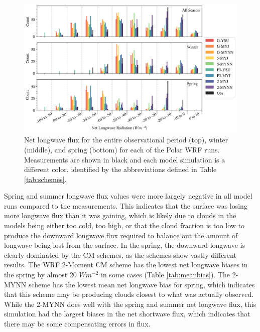 \begin{figure}[h!]
    \centering
    \includegraphics[width=1\linewidth]{figures/chapter3/WRF_NetLW_Histo.png}
    \caption[Polar WRF simulated net longwave flux histograms.]{Net longwave flux for the entire observational period (top), winter (middle), and spring (bottom) for each of the Polar WRF runs. Measurements are shown in black and each model simulation is a different color, identified by the abbreviations defined in Table \ref{tab:schemes}.}
    \label{fig:wrf_netlw}
\end{figure}

 Spring and summer longwave flux values were more largely negative in all model runs compared to the measurements. This indicates that the surface was losing more longwave flux than it was gaining, which is likely due to clouds in the models being either too cold, too high, or that the cloud fraction is too low to produce the downward longwave flux required to balance out the amount of longwave being lost from the surface. In the spring, the downward longwave is clearly dominated by the CM schemes, as the schemes show vastly different results. The WRF 2-Moment CM scheme has the lowest net longwave biases in the spring by almost 20 $Wm^{-2}$ in some cases (Table \ref{tab:meanbias}). The 2-MYNN scheme has the lowest mean net longwave bias for spring, which indicates that this scheme may be producing clouds closest to what was actually observed. While the 2-MYNN does well with the spring and summer net longwave flux, this simulation had the largest biases in the net shortwave flux, which indicates that there may be some compensating errors in flux.

